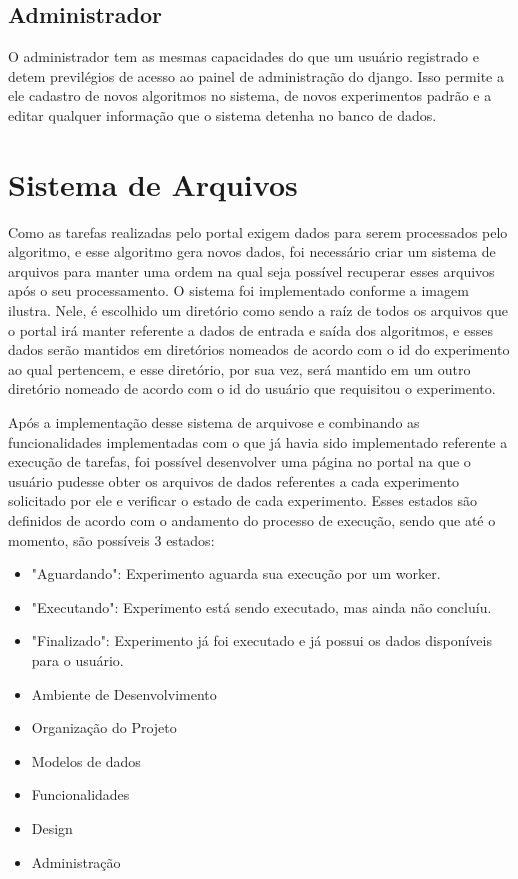 \documentclass[tg]{mdtufsm}
\begin{document}
\subsection{Administrador}
O administrador tem as mesmas capacidades do que um usuário registrado e detem previlégios de acesso ao painel de administração do django. Isso permite a ele cadastro de novos algoritmos no sistema, de novos experimentos padrão e a editar qualquer informação que o sistema detenha no banco de dados.


\section{Sistema de Arquivos}
Como as tarefas realizadas pelo portal exigem dados para serem processados pelo algoritmo, e esse algoritmo gera novos dados, foi necessário criar um sistema de arquivos para manter uma ordem na qual seja possível recuperar esses arquivos após o seu processamento.
O sistema foi implementado conforme a imagem ilustra. Nele, é escolhido um diretório como sendo a raíz de todos os arquivos que o portal irá manter referente a dados de entrada e saída dos algoritmos, e esses dados serão mantidos em diretórios nomeados de acordo com o id do experimento ao qual pertencem, e esse diretório, por sua vez, será mantido em um outro diretório nomeado de acordo com o id do usuário que requisitou o experimento.

Após a implementação desse sistema de arquivose e combinando as funcionalidades implementadas com o que já havia sido implementado referente a execução de tarefas, foi possível desenvolver uma página no portal na que o usuário pudesse obter os arquivos de dados referentes a cada experimento solicitado por ele e verificar o estado de cada experimento. Esses estados são definidos de acordo com o andamento do processo de execução, sendo que até o momento, são possíveis 3 estados: 


\begin{itemize}
	\item "Aguardando": Experimento aguarda sua execução por um worker.
	\item "Executando": Experimento está sendo executado, mas ainda não concluíu.
	\item "Finalizado": Experimento já foi executado e já possui os dados disponíveis para o usuário.
\end{itemize}

\iffalse
\begin{itemize}
	\item Ambiente de Desenvolvimento
	\item Organização do Projeto
	\item Modelos de dados
	\item Funcionalidades
	\item Design
	\item Administração
\end{itemize}
\end{document}
